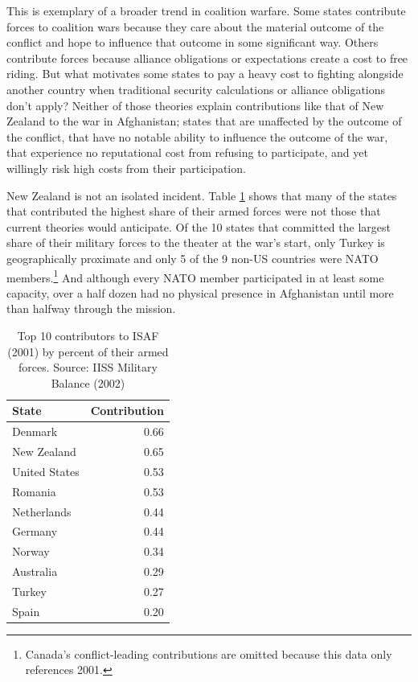 \documentclass[12pt,letterpaper]{article}
\begin{document}
	This is exemplary of a broader trend in coalition warfare. Some states contribute forces to coalition wars because they care about the material outcome of the conflict and hope to influence that outcome in some significant way. Others contribute forces because alliance obligations or expectations create a cost to free riding. But what motivates some states to pay a heavy cost to fighting alongside another country when traditional security calculations or alliance obligations don't apply? Neither of those theories explain contributions like that of New Zealand to the war in Afghanistan; states that are unaffected by the outcome of the conflict, that have no notable ability to influence the outcome of the war, that experience no reputational cost from refusing to participate, and yet willingly risk high costs from their participation.
	
	New Zealand is not an isolated incident. Table \ref{table:2001_top} shows that many of the states that contributed the highest share of their armed forces were not those that current theories would anticipate. Of the 10 states that committed the largest share of their military forces to the theater at the war's start, only Turkey is geographically proximate and only 5 of the 9 non-US countries were NATO members.\footnote{Canada's conflict-leading contributions are omitted because this data only references 2001.} And although every NATO member participated in at least some capacity, over a half dozen had no physical presence in Afghanistan until more than halfway through the mission.

	\begin{table}[ht]
		\centering
		\begin{tabular}{|lr|}
			\hline
			\textbf{State} & \textbf{Contribution} \\
			\hline
			Denmark & 0.66 \\
			New Zealand & 0.65 \\
			United States & 0.53 \\
			Romania & 0.53 \\
			Netherlands & 0.44 \\
			Germany & 0.44 \\
			Norway & 0.34 \\
			Australia & 0.29 \\
			Turkey & 0.27 \\
			Spain & 0.20 \\
			\hline
		\end{tabular}
	\caption{Top 10 contributors to ISAF (2001) by percent of their armed forces. Source: IISS Military Balance (2002)}
	\label{table:2001_top}
	\end{table}
\end{document}

